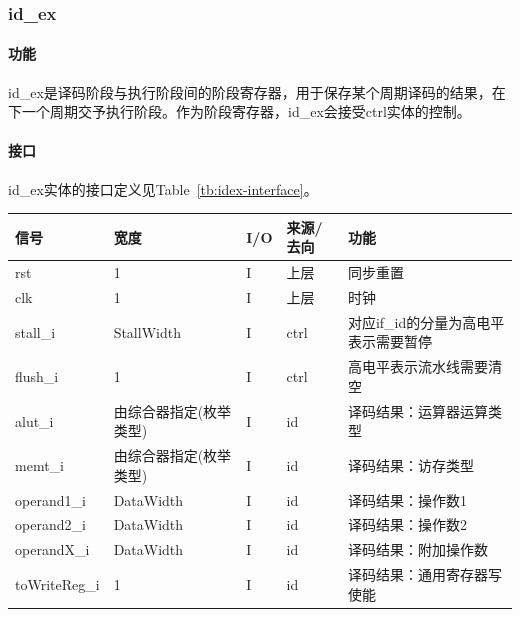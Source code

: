 \documentclass{article}
\begin{document}
\begin{spacing}{1.4}
\subsubsection{id\_ex}

\paragraph{功能}\mbox{}

id\_ex是译码阶段与执行阶段间的阶段寄存器，用于保存某个周期译码的结果，在下一个周期交予执行阶段。作为阶段寄存器，id\_ex会接受ctrl实体的控制。

\paragraph{接口}\mbox{}

id\_ex实体的接口定义见Table~\ref{tb:idex-interface}。
\begin{table}[!htb]
\begin{center}
\begin{tabular*}{17cm}{l|l|l|l|p{5cm}}
\hline
\textbf{信号}&\textbf{宽度}&\textbf{I/O}&\textbf{来源/去向}&\textbf{功能} \\
\hline rst                     & 1                      & I     & 上层          & 同步重置 \\
\hline clk                     & 1                      & I     & 上层          & 时钟 \\
\hline stall\_i                & StallWidth             & I     & ctrl          & 对应if\_id的分量为高电平表示需要暂停 \\
\hline flush\_i                & 1                      & I     & ctrl          & 高电平表示流水线需要清空 \\
\hline alut\_i                 & 由综合器指定(枚举类型) & I     & id            & 译码结果：运算器运算类型 \\
\hline memt\_i                 & 由综合器指定(枚举类型) & I     & id            & 译码结果：访存类型 \\
\hline operand1\_i             & DataWidth              & I     & id            & 译码结果：操作数1 \\
\hline operand2\_i             & DataWidth              & I     & id            & 译码结果：操作数2 \\
\hline operandX\_i             & DataWidth              & I     & id            & 译码结果：附加操作数 \\
\hline toWriteReg\_i           & 1                      & I     & id            & 译码结果：通用寄存器写使能 \\

\end{tabular*}
\end{center}
\end{table}
\end{spacing}
\end{document}
